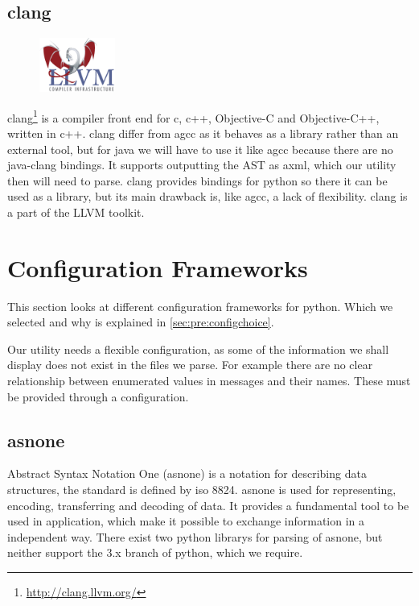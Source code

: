 \subsection{\Gls{clang}}
\label{sec:pre:clang}
\begin{figure}
	\vspace{-20pt}
	\includegraphics[width=2.5cm]{./planning/img/llvm_logo}
	\vspace{-20pt}
\end{figure}
\Gls{clang}\footnote{\url{http://clang.llvm.org/}} is a compiler front end for \Gls{c}, 
\Gls{c++}, \Gls{Objective-C} and \Gls{Objective-C++}, written in \Gls{c++}. \Gls{clang} differ from \Gls{agcc} as it
behaves as a \gls{library} rather than an external tool, but for \Gls{java} we will have to
use it like \Gls{agcc} because there are no \Gls{java}-\Gls{clang} bindings. It supports
outputting the \gls{AST} as \Gls{axml}, which our \gls{utility} then will need to
parse. \Gls{clang} provides bindings for \Gls{python} so there it can be used as a \gls{library},
but its main drawback is, like \Gls{agcc}, a lack of flexibility. \Gls{clang} is a part of
the LLVM toolkit.


\section{Configuration Frameworks}
\label{sec:pre:config}
This section looks at different configuration frameworks for \Gls{python}. Which we
selected and why is explained in \autoref{sec:pre:configchoice}.

Our \gls{utility} needs a flexible configuration, as some of the information we
shall display does not exist in the files we parse. For example there are no
clear relationship between enumerated values in messages and their names.
These must be provided through a configuration.

\subsection{\gls{asnone}}
Abstract Syntax Notation One (\gls{asnone}) is a notation for describing data
structures, the standard is defined by \Gls{iso} 8824. \gls{asnone} is used for
representing, encoding, transferring and decoding of data. It provides a
fundamental tool to be used in application, which make it possible to exchange
information in a independent way. There exist two \Gls{python} \glspl{library} for parsing
of  \gls{asnone}, but neither support the 3.x \gls{branch} of \Gls{python}, which we require.

